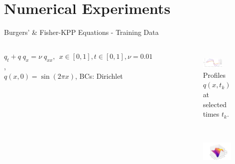 \section{Numerical Experiments}

\begin{frame}{Burgers' \& Fisher-KPP Equations - Training Data}
    
  \begin{columns}[T,onlytextwidth]
    {\tiny $q_t + q\;q_x = \nu\;q_{xx},~~x\in[0,1], t\in[0,1],\nu=0.01$,\\
    $q(x,0) = \sin(2\pi x)$, BCs: Dirichlet }
    \begin{figure}
      \centering
      \begin{subfigure}[t]{\textwidth}
        \centering
        \includegraphics[width=0.7\textwidth]{images/burgers_evol_001.pdf}
        \caption{Profiles \(q(x,t_k)\) at selected times \(t_k\).}
        \label{fig:burgers-surface}
      \end{subfigure}
      \\[1em]
      \begin{subfigure}[t]{0.47\textwidth}
        \centering
        \includegraphics[width=\textwidth]{images/burgers_sol_001.pdf}

\end{subfigure}
\end{figure}
\end{columns}
\end{frame}
